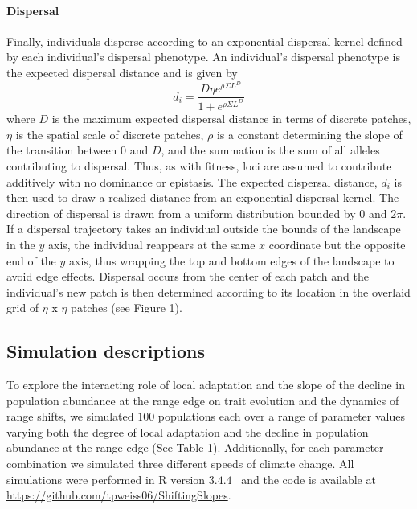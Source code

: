 \documentclass[11pt, oneside]{article}
\begin{document}
\paragraph{Dispersal}
Finally, individuals disperse according to an exponential dispersal kernel defined by each individual's dispersal phenotype. An individual's dispersal phenotype is the expected dispersal distance and is given by
\begin{equation}
d_{i} = \frac{D\eta e^{\rho\Sigma L^{D}}}{1+e^{\rho\Sigma L^{D}}} 
\end{equation}
where $D$ is the maximum expected dispersal distance in terms of discrete patches, $\eta$ is the spatial scale of discrete patches, $\rho$ is a constant determining the slope of the transition between $0$ and $D$, and the summation is the sum of all alleles contributing to dispersal. Thus, as with fitness, loci are assumed to contribute additively with no dominance or epistasis. The expected dispersal distance, $d_{i}$ is then used to draw a realized distance from an exponential dispersal kernel. The direction of dispersal is drawn from a uniform distribution bounded by $0$ and $2\pi$. If a dispersal trajectory takes an individual outside the bounds of the landscape in the $y$ axis, the individual reappears at the same $x$ coordinate but the opposite end of the $y$ axis, thus wrapping the top and bottom edges of the landscape to avoid edge effects. Dispersal occurs from the center of each patch and the individual's new patch is then determined according to its location in the overlaid grid of $\eta$ x $\eta$ patches (see Figure 1).

\subsection{Simulation descriptions}
To explore the interacting role of local adaptation and the slope of the decline in population abundance at the range edge on trait evolution and the dynamics of range shifts, we simulated $100$ populations each over a range of parameter values varying both the degree of local adaptation and the decline in population abundance at the range edge (See Table 1). Additionally, for each parameter combination we simulated three different speeds of climate change. All simulations were performed in R version $3.4.4$~\citep{team2000r} and the code is available at \url{https://github.com/tpweiss06/ShiftingSlopes}. 



\end{document}
